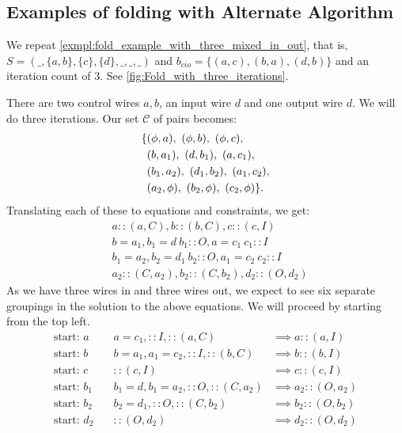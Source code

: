 \subsection{Examples of folding with Alternate Algorithm} %
\label{sub:examples_of_folding_with_alternate_algorithm}
\begin{example}\label{exmpl:alternate_fold_example_with_three_mixed_in_out}
  We repeat \vref{exmpl:fold_example_with_three_mixed_in_out}, that is,
  $S=(\_,\{a,b\},\{c\},\{d\},\_,\_,\_)$ and $b_{cio}=\{(a,c),(b,a),(d,b)\}$
  and an iteration count of $3$. See \vref{fig:Fold_with_three_iterations}.
\end{example}
There are two control wires $a,b$, an input wire $d$ and one output wire $d$. We will do three
iterations. Our set $\mathcal{C}$ of pairs becomes:
\begin{align*}
  \{ & (\phi,a),\ (\phi,b),\ (\phi,c),\\
  & (b,a_1),\ (d,b_1),\ (a,c_1),\\
  & (b_1,a_2),\ (d_1,b_2),\ (a_1,c_2),\\
  & (a_2,\phi),\ (b_2,\phi),\ (c_2,\phi)\}.\\
\end{align*}
Translating each of these to equations and constraints, we get:
\begin{align*}
  &a::(a,C), b::(b,C), c::(c,I)\\
  &b=a_1, b_1=d\ b_1::O, a=c_1\ c_1::I\\
  &b_1=a_2, b_2=d_1\ b_2::O, a_1=c_2\ c_2::I\\
  &a_2::(C,a_2), b_2::(C,b_2), d_2::(O,d_2)
\end{align*}
As we have three wires in and three wires out, we expect to see six separate
groupings in the solution to the above equations. We will proceed by starting
from the top left.
\begin{align*}
  \text{start: }a &\quad a=c_1, ::I, ::(a,C) &\implies a::(a,I)\\
  \text{start: }b &\quad  b=a_1,a_1=c_2, ::I, ::(b,C) &\implies b::(b,I)\\
  \text{start: }c &\quad  ::(c,I) &\implies c::(c,I)\\
  \text{start: }b_1 &\quad  b_1=d, b_1=a_2, ::O, ::(C,a_2) &\implies
    a_2::(O,a_2)\\
  \text{start: }b_2 &\quad  b_2=d_1, ::O, ::(C,b_2) &\implies b_2::(O,b_2)\\
  \text{start: }d_2 &\quad  ::(O,d_2) &\implies d_2::(O,d_2)
\end{align*}

